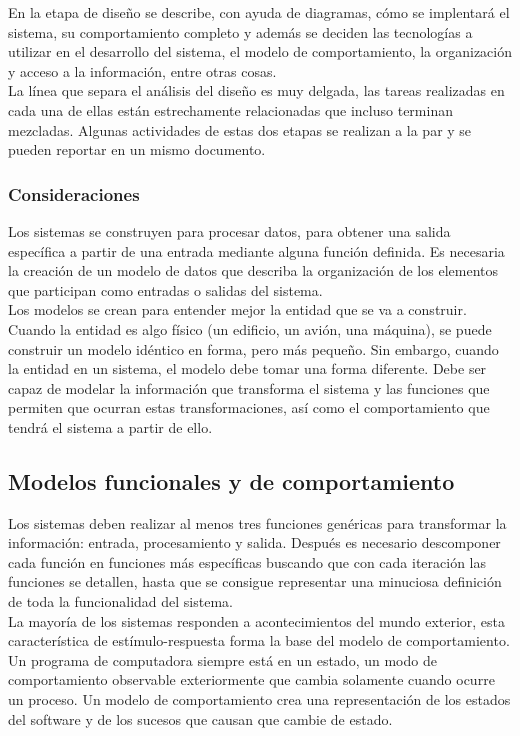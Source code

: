 En la etapa de diseño se describe, con ayuda de diagramas, cómo se implentará el sistema, su comportamiento completo y además se deciden
las tecnologías a utilizar en el desarrollo del sistema, el modelo de comportamiento, la organización y acceso a la información, entre otras cosas.\\

La línea que separa el análisis del diseño es muy delgada, las tareas realizadas en cada una de ellas están estrechamente relacionadas que
incluso terminan mezcladas. Algunas actividades de estas dos etapas se realizan a la par y se pueden reportar en un mismo documento.\\

\subsubsection{Consideraciones}

Los sistemas se construyen para procesar datos, para obtener una salida específica a partir de una entrada mediante alguna función definida. 
Es necesaria la creación de un modelo de datos que describa la organización de los elementos que participan como entradas o salidas del sistema.\\

Los modelos se crean para entender mejor la entidad que se va a construir. Cuando la entidad es algo físico (un edificio, un avión, una máquina), 
se puede construir un modelo idéntico en forma, pero más pequeño. Sin embargo, cuando la entidad en un sistema,
el modelo debe tomar una forma diferente. Debe ser capaz de modelar la información que transforma el sistema y las funciones que 
permiten que ocurran estas transformaciones, así como el comportamiento que tendrá el sistema a partir de ello.\\

\subsection{Modelos funcionales y de comportamiento}
Los sistemas deben realizar al menos tres funciones genéricas para transformar la información: entrada, procesamiento y salida. 
Después es necesario descomponer cada función en funciones más específicas buscando que con cada iteración 
las funciones se detallen, hasta que se consigue representar una minuciosa definición de toda la funcionalidad del sistema.\\

La mayoría de los sistemas responden a acontecimientos del mundo exterior, esta característica de estímulo-respuesta 
forma la base del modelo de comportamiento. Un programa de computadora siempre está en un estado, un modo de comportamiento observable
exteriormente que cambia solamente cuando ocurre un proceso. Un modelo de comportamiento crea una representación de los estados del
software y de los sucesos que causan que cambie de estado.\\

